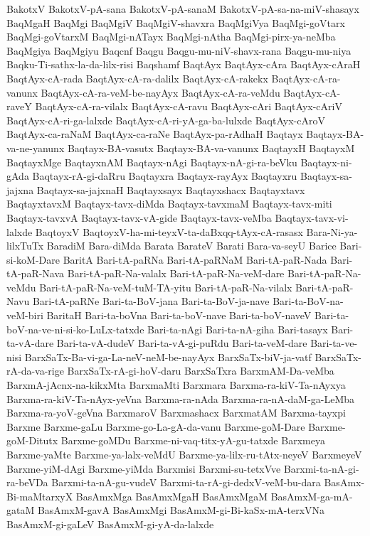 {BakotxV
BakotxV-pA-sana
BakotxV-pA-sanaM
BakotxV-pA-sa-na-miV-shasayx
BaqMgaH
BaqMgi
BaqMgiV
BaqMgiV-shavxra
BaqMgiVya
BaqMgi-goVtarx
BaqMgi-goVtarxM
BaqMgi-nATayx
BaqMgi-nAtha
BaqMgi-pirx-ya-neMba
BaqMgiya
BaqMgiyu
Baqcnf
Baqgu
Baqgu-mu-niV-shavx-rana
Baqgu-mu-niya
Baqku-Ti-sathx-la-da-lilx-risi
Baqshamf
BaqtAyx
BaqtAyx-cAra
BaqtAyx-cAraH
BaqtAyx-cA-rada
BaqtAyx-cA-ra-dalilx
BaqtAyx-cA-rakekx
BaqtAyx-cA-ra-vanunx
BaqtAyx-cA-ra-veM-be-nayAyx
BaqtAyx-cA-ra-veMdu
BaqtAyx-cA-raveY
BaqtAyx-cA-ra-vilalx
BaqtAyx-cA-ravu
BaqtAyx-cAri
BaqtAyx-cAriV
BaqtAyx-cA-ri-ga-lalxde
BaqtAyx-cA-ri-yA-ga-ba-lulxde
BaqtAyx-cAroV
BaqtAyx-ca-raNaM
BaqtAyx-ca-raNe
BaqtAyx-pa-rAdhaH
Baqtayx
Baqtayx-BA-va-ne-yanunx
Baqtayx-BA-vasutx
Baqtayx-BA-va-vanunx
BaqtayxH
BaqtayxM
BaqtayxMge
BaqtayxnAM
Baqtayx-nAgi
Baqtayx-nA-gi-ra-beVku
Baqtayx-ni-gAda
Baqtayx-rA-gi-daRru
Baqtayxra
Baqtayx-rayAyx
Baqtayxru
Baqtayx-sa-jajxna
Baqtayx-sa-jajxnaH
Baqtayxsayx
Baqtayxshacx
Baqtayxtavx
BaqtayxtavxM
Baqtayx-tavx-diMda
Baqtayx-tavxmaM
Baqtayx-tavx-miti
Baqtayx-tavxvA
Baqtayx-tavx-vA-gide
Baqtayx-tavx-veMba
Baqtayx-tavx-vi-lalxde
BaqtoyxV
BaqtoyxV-ha-mi-teyxV-ta-daBxqq-tAyx-cA-rasasx
Bara-Ni-ya-lilxTuTx
BaradiM
Bara-diMda
Barata
BarateV
Barati
Bara-va-seyU
Barice
Bari-si-koM-Dare
BaritA
Bari-tA-paRNa
Bari-tA-paRNaM
Bari-tA-paR-Nada
Bari-tA-paR-Nava
Bari-tA-paR-Na-valalx
Bari-tA-paR-Na-veM-dare
Bari-tA-paR-Na-veMdu
Bari-tA-paR-Na-veM-tuM-TA-yitu
Bari-tA-paR-Na-vilalx
Bari-tA-paR-Navu
Bari-tA-paRNe
Bari-ta-BoV-jana
Bari-ta-BoV-ja-nave
Bari-ta-BoV-na-veM-biri
BaritaH
Bari-ta-boVna
Bari-ta-boV-nave
Bari-ta-boV-naveV
Bari-ta-boV-na-ve-ni-si-ko-LuLx-tatxde
Bari-ta-nAgi
Bari-ta-nA-giha
Bari-tasayx
Bari-ta-vA-dare
Bari-ta-vA-dudeV
Bari-ta-vA-gi-puRdu
Bari-ta-veM-dare
Bari-ta-ve-nisi
BarxSaTx-Ba-vi-ga-La-neV-neM-be-nayAyx
BarxSaTx-biV-ja-vatf
BarxSaTx-rA-da-va-rige
BarxSaTx-rA-gi-hoV-daru
BarxSaTxra
BarxmAM-Da-veMba
BarxmA-jAcnx-na-kikxMta
BarxmaMti
Barxmara
Barxma-ra-kiV-Ta-nAyxya
Barxma-ra-kiV-Ta-nAyx-yeVna
Barxma-ra-nAda
Barxma-ra-nA-daM-ga-LeMba
Barxma-ra-yoV-geVna
BarxmaroV
Barxmashacx
BarxmatAM
Barxma-tayxpi
Barxme
Barxme-gaLu
Barxme-go-La-gA-da-vanu
Barxme-goM-Dare
Barxme-goM-Ditutx
Barxme-goMDu
Barxme-ni-vaq-titx-yA-gu-tatxde
Barxmeya
Barxme-yaMte
Barxme-ya-lalx-veMdU
Barxme-ya-lilx-ru-tAtx-neyeV
BarxmeyeV
Barxme-yiM-dAgi
Barxme-yiMda
Barxmisi
Barxmi-su-tetxVve
Barxmi-ta-nA-gi-ra-beVDa
Barxmi-ta-nA-gu-vudeV
Barxmi-ta-rA-gi-dedxV-veM-bu-dara
BasAmx-Bi-maMtarxyX
BasAmxMga
BasAmxMgaH
BasAmxMgaM
BasAmxM-ga-mA-gataM
BasAmxM-gavA
BasAmxMgi
BasAmxM-gi-Bi-kaSx-mA-terxVNa
BasAmxM-gi-gaLeV
BasAmxM-gi-yA-da-lalxde
}
